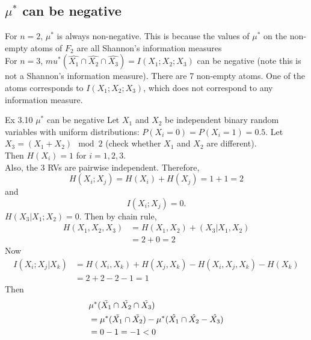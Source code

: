 \documentclass[../main.tex]{subfiles}
\begin{document}
\subsection{\texorpdfstring{$\mu^*$}{\mu} can be negative}
For $n=2$, $\mu^*$ is always non-negative. This is because the values of $\mu^*$ on the non-empty atoms of $F_2$ are all Shannon's information measures\\
For $n=3$, $mu^*(\hat{X_1}\cap\hat{X_2}\cap\hat{X_3}) = I(X_1;X_2;X_3)$ can be negative (note this is not a Shannon's information measure). There are 7 non-empty atoms. One of the atoms corresponds to $I(X_1;X_2;X_3)$, which does not correspond to any information measure.
\begin{pbox}{Ex 3.10 $\mu^*$ can be negative}
    Let $X_1$ and $X_2$ be independent binary random variables with uniform distributions: $P(X_i=0)=P(X_i=1)=0.5$. Let $X_3 = (X_1+X_2)\mod 2$ (check whether $X_1$ and $X_2$ are different). \\
    Then $H(X_i) = 1$ for $i=1,2,3$.\\
    Also, the 3 RVs
    are pairwise independent.
    Therefore, \begin{equation*}
        H(X_i;X_j)=H(X_i)+H(X_j)=1+1=2
    \end{equation*} and \begin{equation*}
        I(X_i;X_j)=0.
    \end{equation*}
$H(X_3|X_1;X_2)=0$.
Then by chain rule,\begin{align*}
    H(X_1,X_2,X_3)&=H(X_1,X_2)+(X_3|X_1,X_2)\\
    &= 2+0 = 2
\end{align*}
Now \begin{align*}
    I(X_i;X_j|X_k)&=H(X_i,X_k)+H(X_j,X_k)-H(X_i,X_j,X_k)-H(X_k)\\
    &=2+2-2-1=1
\end{align*}
Then \begin{align*}
    &\mu^*(\Tilde{X_1}\cap\Tilde{X_2}\cap\Tilde{X_3})\\
    &= \mu^*(\Tilde{X_1}\cap\Tilde{X_2})-\mu^*(\hat{X_1}\cap\hat{X_2}-\hat{X_3})\\
    &=0-1=-1 <0
\end{align*}
 \end{pbox}
\end{document}
